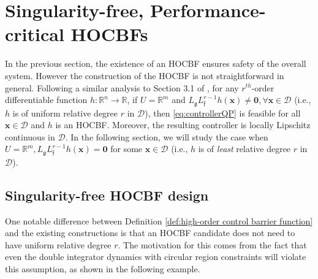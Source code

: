 \documentclass[letterpaper, 10 pt, journal, twoside]{IEEEtran}
\theoremstyle{plain}
\newcommand{\myvar}[1]{\bm{#1}}
\newcommand{\myset}[1]{\mathscr{#1}}
\begin{document}
\section{Singularity-free, Performance-critical HOCBFs}

In the previous section, the existence of an HOCBF ensures safety of the overall system. However the construction of the HOCBF is not straightforward in general. Following a similar analysis to Section 3.1 of \cite{Xu2015a}, for any $r^{th}$-order differentiable function $h: \mathbb{R}^n \to \mathbb{R}$, if $U = \mathbb{R}^m$ and $ L_{\mathfrak{g}}L_{\mathfrak{f}}^{r-1} h( \myvar{x}) \neq \myvar{0}, \forall \myvar{x} \in \myset{D}$ (i.e., $h$ is of uniform relative degree $r$ in $\myset{D}$), then \eqref{eq:controllerQP} is feasible for all $ \myvar{x} \in \myset{D}$ and $h$ is an HOCBF. Moreover, the resulting controller is locally Lipschitz continuous in $\myset{D}$. In the following section, we will study the case when $ U = \mathbb{R}^m, L_{\mathfrak{g}}L_{\mathfrak{f}}^{r-1} h( \myvar{x}) = \myvar{0}$ for some $ \myvar{x} \in \myset{D}$ (i.e., $h$ is of \textit{least} relative degree $r$ in $\myset{D}$).

\subsection{Singularity-free HOCBF design }  

One notable difference between Definition \eqref{def:high-order control barrier function} and the existing constructions  \cite{xu2018constrained,xiao2019control,wences2020correct} is that an HOCBF candidate does not need to have uniform relative degree $r$. The motivation {for this} comes from the fact that even the double integrator dynamics with circular region constraints will violate this assumption, as {shown} in the following example. 
\end{document}
